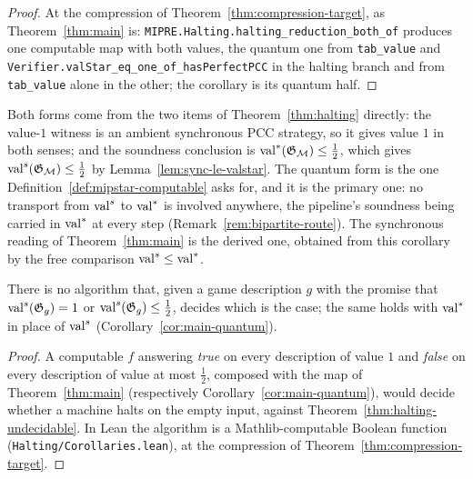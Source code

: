 \begin{proof}
\leanok
At the compression of Theorem~\ref{thm:compression-target}, as Theorem~\ref{thm:main} is:
\texttt{MIPRE.Halting.halting\_reduction\_both\_of} produces one computable map with both
values, the quantum one from \texttt{tab\_value} and
\texttt{Verifier.valStar\_eq\_one\_of\_hasPerfectPCC} in the halting branch and from
\texttt{tab\_value} alone in the other; the corollary is its quantum half.
\end{proof}

Both forms come from the two items of Theorem~\ref{thm:halting} directly: the value-$1$
witness is an ambient synchronous PCC strategy, so it gives value $1$ in both senses; and
the soundness conclusion is $\mathrm{val}^*(\mathfrak{G}_{\mathcal{M}}) \leq \frac12$, which gives
$\mathrm{val}^{s}(\mathfrak{G}_{\mathcal{M}}) \leq \frac12$ by Lemma~\ref{lem:sync-le-valstar}. The quantum
form is the one Definition~\ref{def:mipstar-computable} asks for, and it is the primary one: no
transport from $\mathrm{val}^{s}$ to $\mathrm{val}^*$ is involved anywhere, the pipeline's soundness being
carried in $\mathrm{val}^*$ at every step (Remark~\ref{rem:bipartite-route}). The synchronous
reading of Theorem~\ref{thm:main} is the derived one, obtained from this corollary by the
free comparison $\mathrm{val}^{s} \leq \mathrm{val}^*$.

\begin{corollary}
\label{cor:value-uncomputable}
\leanok
There is no algorithm that, given a game description $g$ with the promise that
$\mathrm{val}^{s}(\mathfrak{G}_g) = 1$ or $\mathrm{val}^{s}(\mathfrak{G}_g) \leq \frac12$, decides which is the
case; the same holds with $\mathrm{val}^*$ in place of $\mathrm{val}^{s}$
(Corollary~\ref{cor:main-quantum}).
\end{corollary}

\begin{proof}
\leanok
A computable $f$ answering \emph{true} on every description of value $1$ and \emph{false} on
every description of value at most $\frac12$, composed with the map of
Theorem~\ref{thm:main} (respectively Corollary~\ref{cor:main-quantum}), would decide
whether a machine halts on the empty input, against Theorem~\ref{thm:halting-undecidable}.
In Lean the algorithm is a Mathlib-computable Boolean function
(\texttt{Halting/Corollaries.lean}), at the compression of
Theorem~\ref{thm:compression-target}.
\end{proof}

